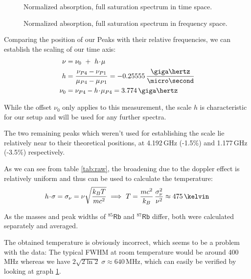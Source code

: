\begin{figure}[p]
	\centering
	
	\vspace{-2em}
	\caption{Normalized absorption, full saturation spectrum in time space.}
	\label{fig:spectrum}
	\vspace{1em}
	
	\vspace{-2em}
	\caption{Normalized absorption, full saturation spectrum in frequency space.}
	\label{fig:spectrum2}
\end{figure}

Comparing the position of our Peaks with their relative frequencies, we can establish the scaling of our time axis:
\begin{align}
	\nu   &= \nu_0 ~+~ h \cdt \mu \\
	 h    &= \frac{\nu_{P4} - \nu_{P1}}{\mu_{P4} - \mu_{P1}} = -0.25555 \,\frac{\giga\hertz}{\micro\second}\\
	\nu_0 &= \nu_{P4} - h \cdt \mu_{P4}  = 3.774 \,\giga\hertz
\end{align}

While the offset $\nu_0$ only applies to this measurement, the scale $h$ is characteristic for our setup and will be used for any further spectra.

\newpage
The two remaining peaks which weren't used for establishing the scale lie relatively near to their theoretical positions, at 4.192\,GHz (-1.5\%) and 1.177\,GHz (-3.5\%) respectively.

As we can see from table \ref{tab:raw}, the broadening due to the doppler effect is relatively uniform and thus can be used to calculate the temperature:
\begin{equation}
 h \cdt \sigma = \sigma_\nu = \nu \sqrt{\frac{k_B T}{m c^2}} ~\Longrightarrow~
T = \frac{m c^2}{k_B} \, \frac{\sigma_\nu^2}{\nu^2} \approx 475\,\kelvin
\end{equation}

As the masses and peak widths of $^{85}\mathsf{Rb}$ and $^{87}\mathsf{Rb}$ differ, both were calculated separately and averaged.

The obtained temperature is obviously incorrect, which seems to be a problem with the data: The typical FWHM at room temperature would be around 400\,MHz whereas we have  $2 \sqrt{2 \ln 2} \; \sigma \approx 640\,$MHz, which can easily be verified by looking at graph \ref{fig:spectrum2}.



